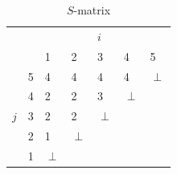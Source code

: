 \documentclass[11pt, letterpaper, titlepage]{article}
\begin{document}
\begin{enumerate}[label=\alph*.]
\begin{paracol}{2}
        \switchcolumn

        {
            \renewcommand{\arraystretch}{1.5}
            \begin{table}[H]
                \footnotesize
                \centering
                \caption*{$S$-matrix}
                \begin{tabular}{P{1em}P{1em}|P{1em}P{1em}P{1em}P{1em}P{1em}}
                        &&&& $i$ && \\
                        &   & 1       & 2       & 3       & 4       & 5       \\ \hline
                        & 5 & 4       & 4       & 4       & 4       & $\perp$ \\
                        & 4 & 2       & 2       & 3       & $\perp$ &         \\
                    $j$ & 3 & 2       & 2       & $\perp$ &         &         \\
                        & 2 & 1       & $\perp$ &         &         &         \\
                        & 1 & $\perp$ &         &         &         &         \\
                \end{tabular}
            \end{table}
        }
\end{paracol}
\end{enumerate}

\newpage
\end{document}
